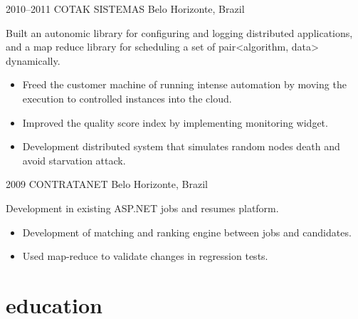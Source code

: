 \documentclass[]{friggeri-cv}
\begin{document}
\begin{entrylist}
\entry
{2010--2011}
{COTAK SISTEMAS}
{Belo Horizonte, Brazil}
{ Built an autonomic library for configuring and logging distributed applications, and a map reduce library for scheduling a set of pair<algorithm, data> dynamically.

%

  \begin{itemize}
    \item Freed the customer machine of running intense automation by moving the execution to controlled instances into the cloud.
    \item Improved the quality score index by implementing monitoring widget.
    \item Development distributed system that simulates random nodes death and avoid starvation attack.
  \end{itemize}
}


\entry
{2009}
{CONTRATANET}
{Belo Horizonte, Brazil}
{ Development in existing ASP.NET jobs and resumes platform.
\begin{itemize}
  \item Development of matching and ranking engine between jobs and candidates.
  \item Used map-reduce to validate changes in regression tests.
  \end{itemize}
}


\end{entrylist}

\section{education}
\end{document}
